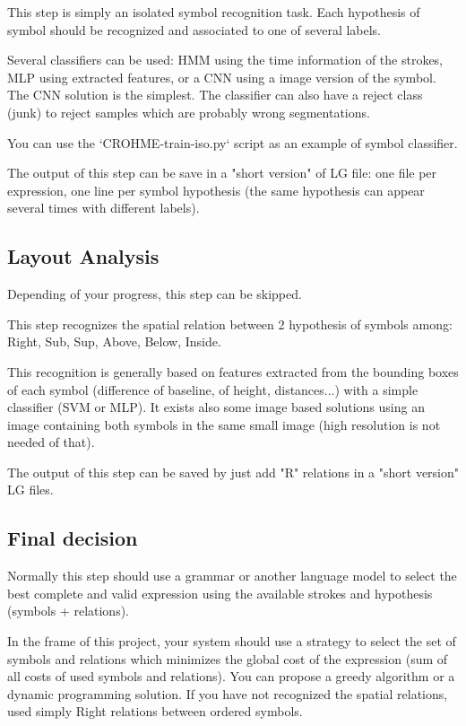 \documentclass{article}
\begin{document}
This step is simply an isolated symbol recognition task. Each hypothesis of symbol should be recognized and associated to one of several labels.

Several classifiers can be used: HMM using the time information of the strokes, MLP using extracted features, or a CNN using a image version of the symbol. The CNN solution is the simplest. The classifier can also have a reject class (junk) to reject samples which are probably wrong segmentations. 

You can use the `CROHME-train-iso.py` script as an example of symbol classifier.

The output of this step can be save in a "short version" of LG file: one file per expression, one line per symbol hypothesis (the same hypothesis can appear several times with different labels).

\subsection{Layout Analysis}
Depending of your progress, this step can be skipped.

This step recognizes the spatial relation between 2 hypothesis of symbols among: Right, Sub, Sup, Above, Below, Inside.

This recognition is generally based on features extracted from the bounding boxes of each symbol (difference of baseline, of height, distances...) with a simple classifier (SVM or MLP). It exists also some image based solutions using an image containing both symbols in the same small image (high resolution is not needed of that).

The output of this step can be saved by just add "R" relations in a "short version" LG files.

\subsection{Final decision}

Normally this step should use a grammar or another language model to select the best complete and valid expression using the available strokes and hypothesis (symbols + relations).

In the frame of this project, your system should use a strategy to select the set of symbols and relations which minimizes the global cost of the expression (sum of all costs of used symbols and relations). You can propose a greedy algorithm or a dynamic programming solution. If you have not recognized the spatial relations, used simply Right relations between ordered symbols.
\end{document}
